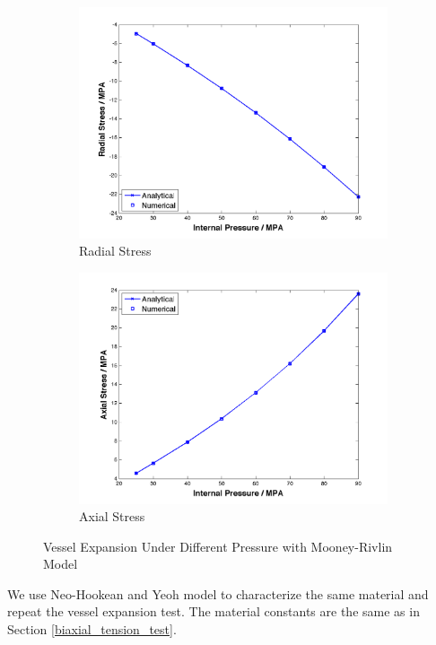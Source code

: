 \begin{figure}[t!p]
	\begin{subfigure}[b]{0.5\textwidth}
		\centering
		\includegraphics[width=\textwidth]{./figures/radial.png}
		\caption{Radial Stress}
		\label{radial}
	\end{subfigure}
	\begin{subfigure}[b]{0.5\textwidth}
		\centering
		\includegraphics[width=\textwidth]{./figures/axial.png}
		\caption{Axial Stress}
		\label{axial}
	\end{subfigure}
	\caption{Vessel Expansion Under Different Pressure with Mooney-Rivlin Model}
	\label{fig:mooney-rivlin2}
\end{figure}

We use Neo-Hookean and Yeoh model to characterize the same material and repeat the vessel expansion test. The material constants are the same as in Section \ref{biaxial_tension_test}.

